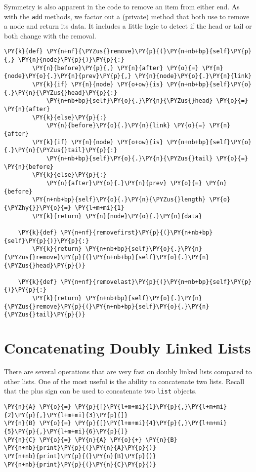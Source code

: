 Symmetry is also apparent in the code to remove an item from either end.
As with the \texttt{add} methods, we factor out a (private) method that both use to remove a node and return its data.
It includes a little logic to detect if the head or tail or both change with the removal.

\begin{Verbatim}[commandchars=\\\{\}]
    \PY{k}{def} \PY{n+nf}{\PYZus{}remove}\PY{p}{(}\PY{n+nb+bp}{self}\PY{p}{,} \PY{n}{node}\PY{p}{)}\PY{p}{:}
        \PY{n}{before}\PY{p}{,} \PY{n}{after} \PY{o}{=} \PY{n}{node}\PY{o}{.}\PY{n}{prev}\PY{p}{,} \PY{n}{node}\PY{o}{.}\PY{n}{link}
        \PY{k}{if} \PY{n}{node} \PY{o+ow}{is} \PY{n+nb+bp}{self}\PY{o}{.}\PY{n}{\PYZus{}head}\PY{p}{:}
            \PY{n+nb+bp}{self}\PY{o}{.}\PY{n}{\PYZus{}head} \PY{o}{=} \PY{n}{after}
        \PY{k}{else}\PY{p}{:}
            \PY{n}{before}\PY{o}{.}\PY{n}{link} \PY{o}{=} \PY{n}{after}
        \PY{k}{if} \PY{n}{node} \PY{o+ow}{is} \PY{n+nb+bp}{self}\PY{o}{.}\PY{n}{\PYZus{}tail}\PY{p}{:}
            \PY{n+nb+bp}{self}\PY{o}{.}\PY{n}{\PYZus{}tail} \PY{o}{=} \PY{n}{before}
        \PY{k}{else}\PY{p}{:}
            \PY{n}{after}\PY{o}{.}\PY{n}{prev} \PY{o}{=} \PY{n}{before}
        \PY{n+nb+bp}{self}\PY{o}{.}\PY{n}{\PYZus{}length} \PY{o}{\PYZhy{}}\PY{o}{=} \PY{l+m+mi}{1}
        \PY{k}{return} \PY{n}{node}\PY{o}{.}\PY{n}{data}

    \PY{k}{def} \PY{n+nf}{removefirst}\PY{p}{(}\PY{n+nb+bp}{self}\PY{p}{)}\PY{p}{:}
        \PY{k}{return} \PY{n+nb+bp}{self}\PY{o}{.}\PY{n}{\PYZus{}remove}\PY{p}{(}\PY{n+nb+bp}{self}\PY{o}{.}\PY{n}{\PYZus{}head}\PY{p}{)}

    \PY{k}{def} \PY{n+nf}{removelast}\PY{p}{(}\PY{n+nb+bp}{self}\PY{p}{)}\PY{p}{:}
        \PY{k}{return} \PY{n+nb+bp}{self}\PY{o}{.}\PY{n}{\PYZus{}remove}\PY{p}{(}\PY{n+nb+bp}{self}\PY{o}{.}\PY{n}{\PYZus{}tail}\PY{p}{)}
\end{Verbatim}


\section{Concatenating Doubly Linked Lists}


There are several operations that are very fast on doubly linked lists compared to other lists.
One of the most useful is the ability to concatenate two lists.
Recall that the plus sign can be used to concatenate two \texttt{list} objects.

\begin{Verbatim}[commandchars=\\\{\}]
\PY{n}{A} \PY{o}{=} \PY{p}{[}\PY{l+m+mi}{1}\PY{p}{,}\PY{l+m+mi}{2}\PY{p}{,}\PY{l+m+mi}{3}\PY{p}{]}
\PY{n}{B} \PY{o}{=} \PY{p}{[}\PY{l+m+mi}{4}\PY{p}{,}\PY{l+m+mi}{5}\PY{p}{,}\PY{l+m+mi}{6}\PY{p}{]}
\PY{n}{C} \PY{o}{=} \PY{n}{A} \PY{o}{+} \PY{n}{B}
\PY{n+nb}{print}\PY{p}{(}\PY{n}{A}\PY{p}{)}
\PY{n+nb}{print}\PY{p}{(}\PY{n}{B}\PY{p}{)}
\PY{n+nb}{print}\PY{p}{(}\PY{n}{C}\PY{p}{)}
\end{Verbatim}



